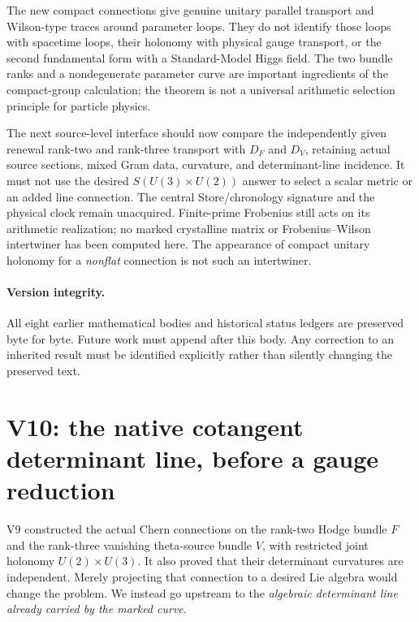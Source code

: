 \documentclass[11pt]{article}
\theoremstyle{definition}
\theoremstyle{remark}
\begin{document}
The new compact connections give genuine unitary parallel transport and
Wilson-type traces around parameter loops. They do not identify those loops
with spacetime loops, their holonomy with physical gauge transport, or the
second fundamental form with a Standard-Model Higgs field. The two bundle
ranks and a nondegenerate parameter curve are important ingredients of the
compact-group calculation; the theorem is not a universal arithmetic
selection principle for particle physics.

The next source-level interface should now compare the independently given
renewal rank-two and rank-three transport with $D_F$ and $D_V$, retaining
actual source sections, mixed Gram data, curvature, and determinant-line
incidence. It must not use the desired $S(U(3)\times U(2))$ answer to select
a scalar metric or an added line connection. The central Store/chronology
signature and the physical clock remain unacquired. Finite-prime Frobenius
still acts on its arithmetic realization; no marked crystalline matrix or
Frobenius--Wilson intertwiner has been computed here. The appearance of
compact unitary holonomy for a \emph{nonflat} connection is not such an
intertwiner.

\paragraph{Version integrity.}
All eight earlier mathematical bodies and historical status ledgers are
preserved byte for byte. Future work must append after this body. Any
correction to an inherited result must be identified explicitly rather than
silently changing the preserved text.

\clearpage
\section{V10: the native cotangent determinant line, before a gauge reduction}
\label{sec:v10-context}

V9 constructed the actual Chern connections on the rank-two Hodge bundle
$F$ and the rank-three vanishing theta-source bundle $V$, with restricted
joint holonomy $U(2)\times U(3)$. It also proved that their determinant
curvatures are independent. Merely projecting that connection to a desired
Lie algebra would change the problem. We instead go upstream to the
\emph{algebraic determinant line already carried by the marked curve}.
\end{document}
